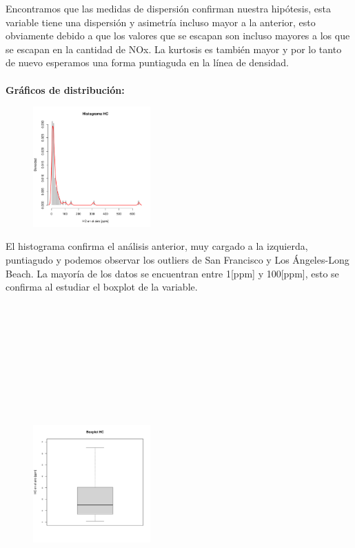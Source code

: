 \documentclass[11pt]{article}
\begin{document}
Encontramos que las medidas de dispersión confirman nuestra hipótesis, esta variable tiene una dispersión y asimetría incluso mayor a la anterior, esto obviamente debido a que los valores que se escapan son incluso mayores a los que se escapan en la cantidad de NOx. La kurtosis es también mayor y por lo tanto de nuevo esperamos una forma puntiaguda en la línea de densidad.
\\
\\
\textbf{Gráficos de distribución:}
\\

\begin{figure}
    \centering
    \includegraphics[width = 0.4\textwidth]{histhc}
\end{figure}

El histograma confirma el análisis anterior, muy cargado a la izquierda, puntiagudo y podemos observar los outliers de San Francisco y Los Ángeles-Long Beach. La mayoría de los datos se encuentran entre 1[ppm] y 100[ppm], esto se confirma al estudiar el boxplot de la variable.
\\
\\
\\
\\
\\
\\
\\
\\
\\
\\

\begin{figure}
    \centering
    \includegraphics[width = 0.4\textwidth]{boxhc}
\end{figure}
\end{document}
